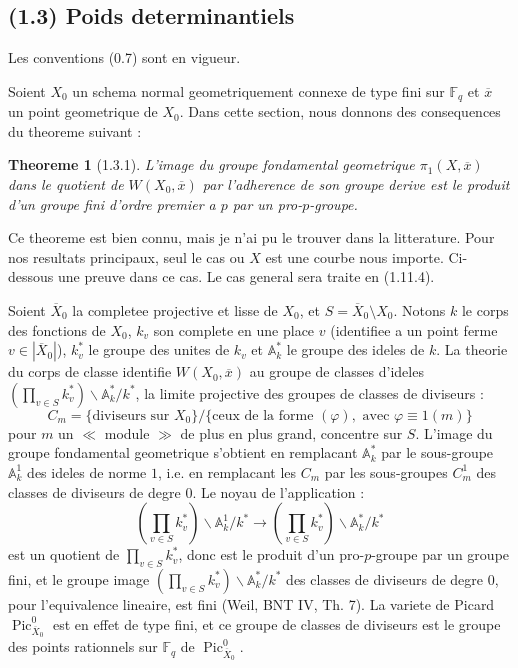 \documentclass[12pt,a4paper]{article}
\theoremstyle{plain}
\newtheorem{theoreme}{Theoreme}[section]
\theoremstyle{definition}
\theoremstyle{definition}
\theoremstyle{remark}
\DeclareMathOperator{\Pic}{Pic}
\begin{document}
\newpage

\subsection*{(1.3) Poids determinantiels}

Les conventions (0.7) sont en vigueur.

Soient $X_0$ un schema normal geometriquement connexe de type fini sur $\mathbb{F}_q$ et $\overline{x}$ un point geometrique de $X_0$. Dans cette section, nous donnons des consequences du theoreme suivant :

\begin{theoreme}[1.3.1]
L'image du groupe fondamental geometrique $\pi_1(X, \overline{x})$ dans le quotient de $W(X_0, \overline{x})$ par l'adherence de son groupe derive est le produit d'un groupe fini d'ordre premier a $p$ par un pro-$p$-groupe.
\end{theoreme}

Ce theoreme est bien connu, mais je n'ai pu le trouver dans la litterature. Pour nos resultats principaux, seul le cas ou $X$ est une courbe nous importe. Ci-dessous une preuve dans ce cas. Le cas general sera traite en (1.11.4).

Soient $\overline{X}_0$ la completee projective et lisse de $X_0$, et $S = \overline{X}_0 \setminus X_0$. Notons $k$ le corps des fonctions de $X_0$, $k_v$ son complete en une place $v$ (identifiee a un point ferme $v \in |\overline{X}_0|$), $k_v^*$ le groupe des unites de $k_v$ et $\mathbb{A}_k^*$ le groupe des ideles de $k$. La theorie du corps de classe identifie $W(X_0, \overline{x})$ au groupe de classes d'ideles $(\prod_{v \in S} k_v^*) \backslash \mathbb{A}_k^* / k^*$, la limite projective des groupes de classes de diviseurs :
\[C_m = \{\text{diviseurs sur } X_0\} / \{\text{ceux de la forme } (\varphi), \text{ avec } \varphi \equiv 1 (m)\}\]
pour $m$ un $\ll$ module $\gg$ de plus en plus grand, concentre sur $S$. L'image du groupe fondamental geometrique s'obtient en remplacant $\mathbb{A}_k^*$ par le sous-groupe $\mathbb{A}_k^1$ des ideles de norme $1$, i.e. en remplacant les $C_m$ par les sous-groupes $C_m^1$ des classes de diviseurs de degre $0$. Le noyau de l'application :
\[(\prod_{v \in S} k_v^*) \backslash \mathbb{A}_k^1 / k^* \to (\prod_{v \in S} k_v^*) \backslash \mathbb{A}_k^* / k^*\]
est un quotient de $\prod_{v \in S} k_v^*$, donc est le produit d'un pro-$p$-groupe par un groupe fini, et le groupe image $(\prod_{v \in S} k_v^*) \backslash \mathbb{A}_k^* / k^*$ des classes de diviseurs de degre $0$, pour l'equivalence lineaire, est fini (Weil, BNT IV, Th. 7). La variete de Picard $\Pic^0_{\overline{X}_0}$ est en effet de type fini, et ce groupe de classes de diviseurs est le groupe des points rationnels sur $\mathbb{F}_q$ de $\Pic^0_{\overline{X}_0}$.
\end{document}
